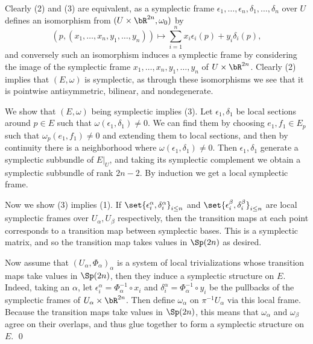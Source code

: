 \eprop

\bproof

    Clearly (2) and (3) are equivalent, as a symplectic frame $\epsilon_1,\dots,\epsilon_n,\delta_1,\dots,\delta_n$ over $U$ defines an isomorphism from $(U\times\bR^{2n},\omega_0)$ by
    $$ (p,(x_1,\dots,x_n,y_1,\dots,y_n)) \mapsto \sum_{i=1}^n x_i\epsilon_i(p) + y_i\delta_i(p) , $$
    and conversely such an isomorphism induces a symplectic frame by considering the image of the symplectic frame $x_1,\dots,x_n,y_1,\dots,y_n$ of $U\times\bR^{2n}$.
    Clearly (2) implies that $(E,\omega)$ is symplectic, as through these isomorphisms we see that it is pointwise antisymmetric, bilinear, and nondegenerate.

    We show that $(E,\omega)$ being symplectic implies (3).
    Let $\epsilon_1,\delta_1$ be local sections around $p\in E$ such that $\omega(\epsilon_1,\delta_1)\neq0$.
    We can find them by choosing $e_1,f_1\in E_p$ such that $\omega_p(e_1,f_1)\neq0$ and extending them to local sections, and then by continuity there is a neighborhood where $\omega(\epsilon_1,\delta_1)\neq0$.
    Then $\epsilon_1,\delta_1$ generate a symplectic subbundle of $E|_U$, and taking its symplectic complement we obtain a symplectic subbundle of rank $2n-2$.
    By induction we get a local symplectic frame.

    Now we show (3) implies (1).
    If $\set{\epsilon^\alpha_i,\delta^\alpha_i}_{i\leq n}$ and $\set{\epsilon^\beta_i,\delta^\beta_i}_{i\leq n}$ are local symplectic frames over $U_\alpha,U_\beta$ respectively,
    then the transition maps at each point corresponds to a transition map between symplectic bases.
    This is a symplectic matrix, and so the transition map takes values in $\Sp(2n)$ as desired.

    Now assume that $(U_\alpha,\Phi_\alpha)_\alpha$ is a system of local trivializations whose transition maps take values in $\Sp(2n)$, then they induce a symplectic structure on $E$.
    Indeed, taking an $\alpha$, let $\epsilon_i^\alpha=\Phi_\alpha^{-1}\circ x_i$ and $\delta_i^\alpha=\Phi_\alpha^{-1}\circ y_i$ be the pullbacks of the symplectic frames of $U_\alpha\times\bR^{2n}$.
    Then define $\omega_\alpha$ on $\pi^{-1}U_\alpha$ via this local frame.
    Because the transition maps take values in $\Sp(2n)$, this means that $\omega_\alpha$ and $\omega_\beta$ agree on their overlaps, and thus glue together to form a symplectic structure on $E$.
    \qed

\eproof

\bdefn

